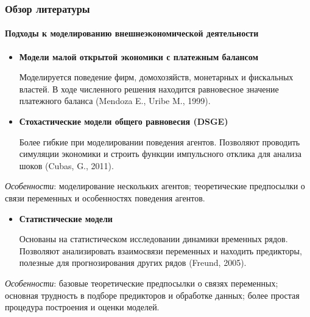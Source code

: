 \documentclass[9pt]{beamer}
\begin{document}
\begin{frame}
\frametitle{Обзор литературы}
\framesubtitle{Подходы к моделированию внешнеэкономической деятельности}


\begin{itemize}
	\item \textbf{Модели малой открытой экономики с платежным балансом} 
	
	Моделируется поведение фирм, домохозяйств, монетарных и фискальных властей.
	В ходе численного решения находится равновесное значение платежного баланса (Mendoza E., Uribe M., 1999).
	
	\item \textbf{Стохастические модели общего равновесия (DSGE)}
	
	Более гибкие при моделировании поведения агентов. 
	Позволяют проводить симуляции экономики и строить функции импульсного отклика для анализа шоков (Cubas, G., 2011).
\end{itemize}

	\textit{Особенности}: моделирование нескольких агентов; теоретические предпосылки о связи переменных и особенностях поведения агентов.	
	
	\begin{itemize}
	\item \textbf{Статистические модели}
	
	Основаны на статистическом исследовании динамики временных рядов.
	Позволяют анализировать взаимосвязи переменных и находить предикторы, полезные для прогнозирования других рядов (Freund, 2005).
\end{itemize}	

\textit{Особенности}: базовые теоретические предпосылки о связях переменных; основная трудность в подборе предикторов и обработке данных; более простая процедура построения и оценки моделей.
\end{frame}
\end{document}
